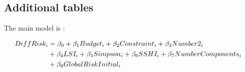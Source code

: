 \clearpage

\subsection{Additional tables}
\label{sec:appendix_reg}
The main model is : 

\begin{align}
\label{model:simple}
DiffRisk_{i} &= \beta_0 + \beta_1 Budget_i + \beta_2 Constraint_i + \beta_3 Number2_i \\
&+ \beta_4 LSI_i + \beta_5 Simpson_i + \beta_6 SSHI_i + \beta_7 NumberComponents_i \notag \\
& + \beta_8 GlobalRiskInitial_i \notag
\end{align}

